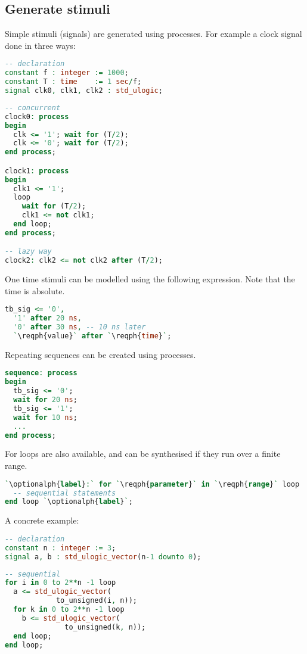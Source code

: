 \subsection{Generate stimuli}
Simple stimuli (signals) are generated using processes. For example a clock
signal done in three ways:
\begin{lstlisting}[language=vhdl]
-- declaration
constant f : integer := 1000;
constant T : time    := 1 sec/f;
signal clk0, clk1, clk2 : std_ulogic;
\end{lstlisting}
\begin{lstlisting}[language=vhdl]
-- concurrent
clock0: process
begin
  clk <= '1'; wait for (T/2);
  clk <= '0'; wait for (T/2);
end process;

clock1: process
begin
  clk1 <= '1';
  loop
    wait for (T/2);
    clk1 <= not clk1;
  end loop;
end process;

-- lazy way
clock2: clk2 <= not clk2 after (T/2);
\end{lstlisting}
One time stimuli can be modelled using the following expression. Note that the
time is absolute.
\begin{lstlisting}[language=vhdl]
tb_sig <= '0',
  '1' after 20 ns,
  '0' after 30 ns, -- 10 ns later
  `\reqph{value}` after `\reqph{time}`;
\end{lstlisting}
Repeating sequences can be created using processes.
\begin{lstlisting}[language=vhdl]
sequence: process
begin
  tb_sig <= '0';
  wait for 20 ns;
  tb_sig <= '1';
  wait for 10 ns;
  ...
end process;
\end{lstlisting}
For loops are also available, and can be synthesised if they run over a finite
range.
\begin{lstlisting}[language=vhdl]
`\optionalph{label}:` for `\reqph{parameter}` in `\reqph{range}` loop
  -- sequential statements
end loop `\optionalph{label}`;
\end{lstlisting}
A concrete example:
\begin{lstlisting}[language=vhdl]
-- declaration
constant n : integer := 3;
signal a, b : std_ulogic_vector(n-1 downto 0);
\end{lstlisting}
\begin{lstlisting}[language=vhdl]
-- sequential
for i in 0 to 2**n -1 loop
  a <= std_ulogic_vector(
            to_unsigned(i, n));
  for k in 0 to 2**n -1 loop
    b <= std_ulogic_vector(
              to_unsigned(k, n));
  end loop;
end loop;
\end{lstlisting}

